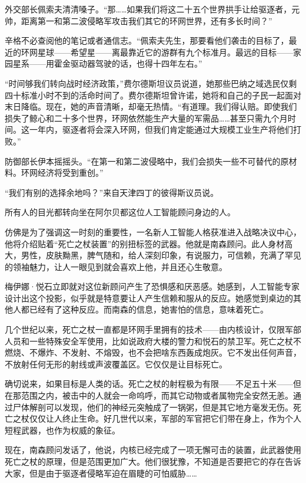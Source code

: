\documentclass[AutoFakeBold=true]{book}
\begin{document}
外交部长佩索夫清清嗓子。``那……如果我们将这二十五个世界拱手让给驱逐者，元帅，距离第一和第二波侵略军攻击我们其它的环网世界，还有多长时间？''

辛格不必查阅他的笔记或者通信志。``佩索夫先生，那要看他们袭击的目标了，最近的环网星球——希望星——离最靠近它的游群有九个标准月。最远的目标——家园星系——用霍金驱动器驾驶的话，也得十四年左右。''

``时间够我们转向战时经济政策，''费尔德斯坦议员说道，她那些巴纳之域选民仅剩四十标准小时不到的活命时间了。费尔德斯坦曾许诺，她将和自己的子民一起面对末日降临。现在，她的声音清晰，却毫无热情。``有道理。我们得认赔。即使我们损失了鲸心和二十多个世界，环网依然能生产大量的军需品……甚至只需九个月时间。这一年内，驱逐者将会深入环网，但我们肯定能通过大规模工业生产将他们打败。''

防御部长伊本摇摇头。``在第一和第二波侵略中，我们会损失一些不可替代的原材料。环网经济将受到重创。''

``我们有别的选择余地吗？''来自天津四丁的彼得斯议员说。

所有人的目光都转向坐在阿尔贝都这位人工智能顾问身边的人。

仿佛是为了强调这一时刻的重要性，一名新人工智能人格获准进入战略决议中心，他将介绍贴着``死亡之杖装置''的别扭标签的武器。他就是南森顾问。此人身材高大，男性，皮肤黝黑，脾气随和，给人深刻印象，有说服力，可信赖，充满了罕见的领袖魅力，让人一眼见到就会喜欢上他，并且还心生敬意。

梅伊娜·悦石立即就对这位新顾问产生了恐惧感和厌恶感。她感到，人工智能专家设计出这个投影，似乎就是特意要让人产生信赖和服从的反应。她感觉到桌边的其他人都已经有了这种反应。而南森的信息，她害怕的信息，意味着死亡。

几个世纪以来，死亡之杖一直都是环网手里拥有的技术——由内核设计，仅限军部人员和一些特殊安全军使用，比如说政府大楼的警力和悦石的禁卫军。死亡之杖不燃烧、不爆炸、不发射、不熔毁，也不会把啥东西轰成炮灰。它不发出任何声音，不放射任何无形的射线或声波覆盖区。它仅仅是让目标死亡。

确切说来，如果目标是人类的话。死亡之杖的射程极为有限——不足五十米——但在那范围之内，被击中的人就会一命呜呼，而其它动物或者属物完全安然无恙。通过尸体解剖可以发现，他们的神经元突触成了一锅粥，但是其它地方毫发无伤。死亡之杖仅仅让人终止生命。好几世代以来，军部的军官把它们带在身上，作为个人短程武器，也作为权威的象征。

现在，南森顾问发话了，他说，内核已经完成了一项无懈可击的装置，此武器使用死亡之杖的原理，但是范围更加广大。他们很犹豫，不知道是否要把它的存在告诉大家，但是由于驱逐者侵略军迫在眉睫的可怕威胁……
\end{document}
